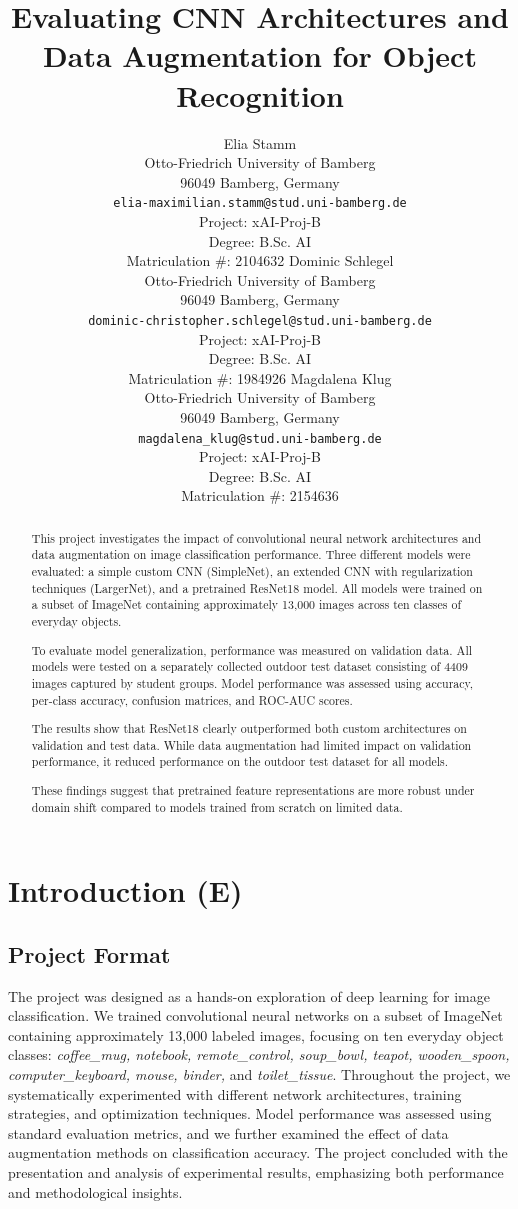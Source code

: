 \documentclass[a4paper]{article}
\title{Evaluating CNN Architectures and Data Augmentation for Object Recognition}
\author{%
  Elia Stamm\\
  Otto-Friedrich University of Bamberg\\
  96049 Bamberg, Germany\\
  \texttt{elia-maximilian.stamm@stud.uni-bamberg.de} \\[0.5cm]
  Project: xAI-Proj-B \\
  Degree: B.Sc. AI \\
  Matriculation \#: 2104632
  \And
  Dominic Schlegel\\
  Otto-Friedrich University of Bamberg\\
  96049 Bamberg, Germany\\
  \texttt{dominic-christopher.schlegel@stud.uni-bamberg.de} \\[0.5cm]
  Project: xAI-Proj-B \\
  Degree: B.Sc. AI \\
  Matriculation \#: 1984926
  \And
  Magdalena Klug \\
  Otto-Friedrich University of Bamberg\\
  96049 Bamberg, Germany\\
  \texttt{magdalena\_klug@stud.uni-bamberg.de} \\[0.5cm]
  Project: xAI-Proj-B \\
  Degree: B.Sc. AI \\
  Matriculation \#: 2154636
}
\begin{document}
\maketitle
\def\va{{\bm{a}}}

\begin{abstract}
This project investigates the impact of convolutional neural network architectures and data augmentation on image classification performance. 
Three different models were evaluated: a simple custom CNN (SimpleNet), an extended CNN with regularization techniques (LargerNet), and a pretrained ResNet18 model. 
All models were trained on a subset of ImageNet containing approximately 13,000 images across ten classes of everyday objects.

To evaluate model generalization, performance was measured on validation data. All models were tested on a separately collected outdoor test dataset consisting of 4409 images captured by student groups. 
Model performance was assessed using accuracy, per-class accuracy, confusion matrices, and ROC-AUC scores.

The results show that ResNet18 clearly outperformed both custom architectures on validation and test data. 
While data augmentation had limited impact on validation performance, it reduced performance on the outdoor test dataset for all models.

These findings suggest that pretrained feature representations are more robust under domain shift compared to models trained from scratch on limited data.
\end{abstract}



\section{Introduction (E)}
\subsection{Project Format}
The project was designed as a hands-on exploration of deep learning for image classification. We trained convolutional neural networks on a subset of ImageNet containing approximately 13,000 labeled images, focusing on ten everyday object classes: \textit{coffee\_mug, notebook, remote\_control, soup\_bowl, teapot, wooden\_spoon, computer\_keyboard, mouse, binder,} and \textit{toilet\_tissue}. Throughout the project, we systematically experimented with different network architectures, training strategies, and optimization techniques. Model performance was assessed using standard evaluation metrics, and we further examined the effect of data augmentation methods on classification accuracy. The project concluded with the presentation and analysis of experimental results, emphasizing both performance and methodological insights. 
\end{document}
